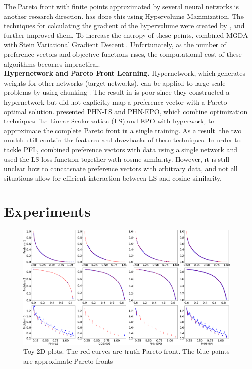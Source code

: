 \documentclass[letterpaper]{article} %
\begin{document}
The Pareto front with finite points approximated by several neural networks is another research direction. \cite{deist2021multiobjective} has done this using Hypervolume Maximization. The techniques for calculating the gradient of the hypervolume were created by \cite{hypervolumegrad}, and \citep{Dominated-front1, Deist_2020} further improved them. To increase the entropy of these points, \cite{moosvgd} combined MGDA \cite{gradientbased3} with Stein Variational Gradient Descent \cite{svgd}. Unfortunately, as the number of preference vectors and objective functions rises, the computational cost of these algorithms becomes impractical. \\
\indent \textbf{Hypernetwork and Pareto Front Learning.} Hypernetwork, which generates weights for other networks (target networks), can be applied to large-scale problems by using chunking \cite{hyper_origin}. The result in \cite{controllable} is poor since they constructed a hypernetwork but did not explicitly map a preference vector with a Pareto optimal solution. \cite{navon2021learning} presented PHN-LS and PHN-EPO, which combine optimization techniques like Linear Scalarization (LS) and EPO \cite{pmlr-v119-mahapatra20a} with hyperwork, to approximate the complete Pareto front in a single training. As a result, the two models still contain the features and drawbacks of these techniques.  In order to tackle PFL, \cite{ruchte2021scalable} combined preference vectors with data using a single network and used the LS loss function together with cosine similarity. However, it is still unclear how to concatenate preference vectors with arbitrary data, and not all situations allow for efficient interaction between LS and cosine similarity.

\section{Experiments}
\label{st:5}
\begin{figure}
\centering
\includegraphics[width=\textwidth]{figures/Toy_Plots.pdf}
\caption{Toy 2D plots. The red curves are truth Pareto front. The blue points are approximate Pareto fronts}
\end{figure}
\end{document}
